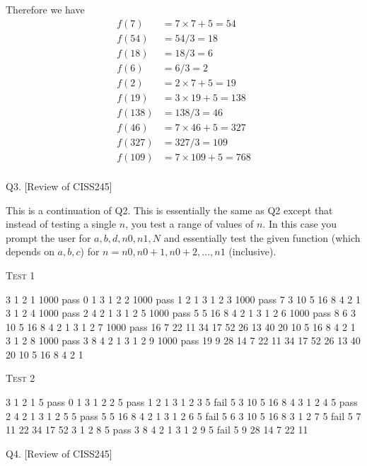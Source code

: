 Therefore we have
\begin{align*}
f(7)   &= 7 \times 7+5 = 54 \\
f(54)  &= 54/3 = 18 \\
f(18)  &= 18/3 = 6 \\
f(6)   &= 6/3 = 2 \\
f(2)   &= 2 \times 7+5 = 19 \\
f(19)  &= 3 \times 19+5 = 138 \\
f(138) &= 138/3 = 46 \\
f(46)  &= 7 \times 46+5 = 327 \\
f(327) &= 327/3 = 109 \\
f(109) &= 7 \times 109+5 = 768 \\
\end{align*}




\newpage
Q3. [Review of CISS245]

This is a continuation of Q2.
This is essentially the same as Q2 except that instead of testing a single 
$n$, you test a range of values
of $n$. 
In this case you prompt the user for $a, b, d, n0, n1, N$ and
essentially test the given function
(which depends on $a, b, c$) for $n = n0, n0+1, n0+2, ..., n1$ (inclusive).

\textsc{Test 1}
\begin{console}[frame=single,fontsize=\footnotesize, commandchars=\\\{\}]
3 1 2 1 1000 pass 0 1
3 1 2 2 1000 pass 1 2 1
3 1 2 3 1000 pass 7 3 10 5 16 8 4 2 1
3 1 2 4 1000 pass 2 4 2 1
3 1 2 5 1000 pass 5 5 16 8 4 2 1
3 1 2 6 1000 pass 8 6 3 10 5 16 8 4 2 1
3 1 2 7 1000 pass 16 7 22 11 34 17 52 26 13 40 20 10 5 16 8 4 2 1
3 1 2 8 1000 pass 3 8 4 2 1
3 1 2 9 1000 pass 19 9 28 14 7 22 11 34 17 52 26 13 40 20 10 5 16 8 4 2 1
\end{console}

\textsc{Test 2}
\begin{console}[frame=single,fontsize=\footnotesize, commandchars=\\\{\}]
3 1 2 1 5 pass 0 1
3 1 2 2 5 pass 1 2 1
3 1 2 3 5 fail 5 3 10 5 16 8 4
3 1 2 4 5 pass 2 4 2 1
3 1 2 5 5 pass 5 5 16 8 4 2 1
3 1 2 6 5 fail 5 6 3 10 5 16 8
3 1 2 7 5 fail 5 7 11 22 34 17 52
3 1 2 8 5 pass 3 8 4 2 1
3 1 2 9 5 fail 5 9 28 14 7 22 11
\end{console}



\newpage
Q4. [Review of CISS245]

